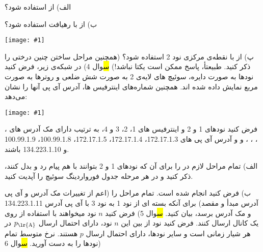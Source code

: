 \documentclass[10pt,letterpaper]{article}
\newcommand{\pic}[2]{
\begin{center}
\texttt{[image: \#1]}
\end{center}
}
\newcommand{\mA}{\lr{mA}}
\newcommand{\mB}{\lr{mB}}
\newcommand{\mC}{\lr{mC}}
\newcommand{\mD}{\lr{mD}}
\newcommand{\mE}{\lr{mE}}
\newcommand{\mF}{\lr{mF}}
\begin{document}
الف) از  استفاده شود؟

ب) از  با رهیافت  استفاده شود؟
\pic{Q3}{80mm}
پ) از  با نقطه‌ی مرکزی نود 2 استفاده شود؟ (همچنین مراحل ساختن چنین درختی را ذکر کنید. طبیعتأ، پاسخ ممکن است یکتا نباشد!)
\hl
سوال 4) در شبکه‌ی زیر، فرض کنید نودها به صورت دایره، سوئیچ های لایه‌ی 2 به صورت شش ضلعی و روترها به صورت مربع نمایش داده شده اند. همچنین شماره‌های اینترفیس ها، آدرس آی پی آنها را نشان می‌دهد:
\pic{Q4}{100mm}
فرض کنید نودهای 1 و 2 و اینترفیس های 1، 2، 3 و 4، به ترتیب دارای مک آدرس های \mA، \mB، \mC، \mD، \mE  و  \mF  و آدرس آی پی های 172.17.1.3، 172.17.1.4، 172.17.1.5، 100.99.1.8، 100.99.1.9 و 134.223.1.10 باشند.

الف) تمام مراحل لازم در  را برای آن که نودهای 1 و 2 بتوانند با هم پیام رد و بدل کنند، ذکر کنید و در هر مرحله جدول فورواردینگ سوئیچ  را آپدیت کنید.

ب) فرض کنید  انجام شده است. تمام مراحل را (اعم از تغییرات مک آدرس و آی پی آدرس مبدأ و مقصد) برای آنکه بسته ای از نود 1 به نود 3 با آی پی آدرس 134.223.1.11 و مک آدرس  برسد، بیان کنید.
\hl
سوال 5) فرض کنید $n$ نود میخواهند با استفاده از  روی یک کانال ارسال کنند. فرض کنید نود  از بین این $n$ نود، دارای احتمال ارسال $p_\text{\lr{A}}$ در هر شیار زمانی است و سایر نودها، دارای احتمال ارسال $p$ هستند. نرخ متوسط تمام نودها را به دست آورید.
\hl
سوال 6) 
\end{document}
